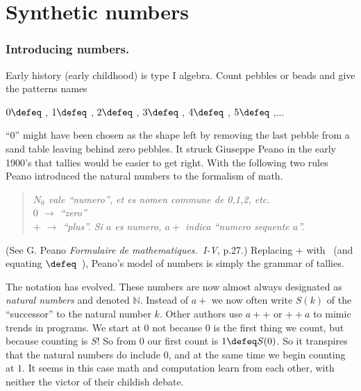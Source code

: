 \chapter{Synthetic numbers}

\subsection{Introducing numbers.}
Early history (early childhood) is type I algebra.  Count 
pebbles or beads and give the patterns names
\begin{center}
    $0\defeq$ \underline{\hspace{5mm}}, 
    $1\defeq$ \StrokeOne,
    $2\defeq$ \StrokeTwo,
    $3\defeq$ \StrokeThree,
    $4\defeq$ \StrokeFour,
    $5\defeq$ \StrokeFive,...
\end{center}
``0'' might have been chosen as the shape left by removing the last pebble from a sand 
table leaving behind zero pebbles.
It struck Giuseppe Peano in the early 1900's that tallies 
would be easier to get right. With the following two rules
Peano introduced the natural numbers to the formalism of math.
\begin{quote}
    \textit{
    $N_0$ vale ``numero'', et es nomen commune de 0,1,2, etc.\\
    $0$ $\to$  ``zero''\\
    $+$ $\to$ ``plus''.  Si $a$ es numero, $a+$ indica ``numero sequente $a$''.
    }
\end{quote}
(See G. Peano \emph{Formulaire de mathematiques.~I-V}, p.27.)
Replacing $+$ with \StrokeOne ~(and equating \StrokeFive$\defeq$\StrokeFour~\StrokeOne),
Peano's model of numbers is simply the grammar of tallies.


The notation has evolved.  These numbers are now almost always designated as
\emph{natural numbers} and denoted $\mathbb{N}$.  Instead of $a+$ we now 
often write $S(k)$ of the ``successor'' to the natural number $k$.  Other 
authors use $a++$ or $++a$ to mimic trends in programs.  We start at
$0$ not because $0$ is the first thing we count, but because counting is $S$! So
from $0$ our first count is $1\defeq S(0)$. So it transpires that the natural
numbers do include $0$, and at the same time we begin counting at $1$.  It seems
in this case math and computation  learn from each other, with neither the victor of 
their childish debate.

